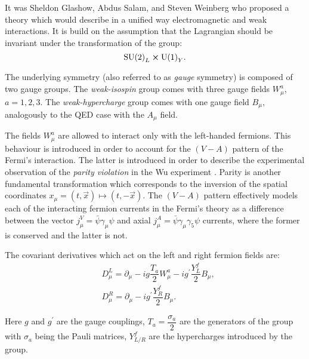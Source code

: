 It was Sheldon Glashow, Abdus Salam, and Steven Weinberg who proposed a theory which would describe in a unified way electromagnetic and weak interactions. It is build on the assumption that the Lagrangian should be invariant under the transformation of the group:
\begin{equation}
    \text{SU(2)}_L \cross \text{U(1)}_Y.
\end{equation}

The underlying symmetry (also referred to as \textit{gauge} symmetry) is composed of two gauge groups. The \textit{weak-isospin} group \sutwo comes with three gauge fields $W^a_\mu$, $a=1,2,3$. The \textit{weak-hypercharge} group \uone comes with one gauge field $B_\mu$, analogously to the QED case with the $A_\mu$ field. 

The fields $W^a_\mu$ are allowed to interact only with the left-handed fermions. This behaviour is introduced in order to account for the $(V-A)$ pattern of the Fermi's interaction. The latter is introduced in order to describe the experimental observation of the \textit{parity violation} in the Wu experiment \cite{PhysRev.105.1413}. Parity is another fundamental transformation which corresponds to the inversion of the spatial coordinates $x_\mu = (t, \vec{x}) \mapsto (t, -\vec{x})$. The $(V-A)$ pattern effectively models each of the interacting fermion currents in the Fermi's theory as a difference between the vector $j_\mu^V = \bar{\psi}\gamma_\mu\psi$ and axial $j_\mu^A = \bar{\psi}\gamma_\mu\gamma_5\psi$ currents, where the former is conserved and the latter is not. 

The covariant derivatives which act on the left and right fermion fields are:
\begin{align}
    &D^L_\mu = \partial_\mu - ig\dfrac{T_a}{2}W^a_\mu - ig^\prime\dfrac{Y_L^f}{2}B_\mu,\\
    &D^R_\mu = \partial_\mu - ig^\prime\dfrac{Y_R^f}{2}B_\mu.
\end{align}

Here $g$ and $g^\prime$ are the gauge couplings, $T_a = \dfrac{\sigma_a}{2}$ are the generators of the \sutwo group with $\sigma_a$ being the Pauli matrices, $Y^f_{L/R}$ are the hypercharges introduced by the \uone group. 

